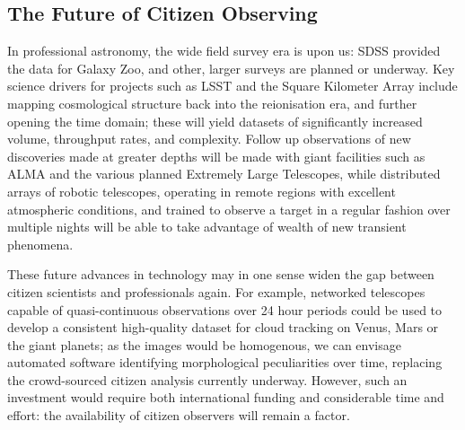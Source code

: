\documentclass{ar2e}
\begin{document}


\subsection{The Future of Citizen Observing}

In professional astronomy, the wide field survey era is upon us: SDSS provided
the data for Galaxy Zoo, and other, larger surveys are planned or underway. Key
science drivers for projects such as LSST and the Square Kilometer Array include
mapping cosmological structure back into the reionisation era, and  further
opening the time domain; these will yield datasets of significantly increased
volume, throughput rates, and complexity.  Follow up observations of new
discoveries made at greater depths will be made with giant facilities such as
ALMA and the various planned Extremely Large Telescopes, while distributed
arrays of robotic telescopes, operating in remote regions with excellent
atmospheric conditions, and trained to observe a target in a regular fashion
over multiple nights will be able to take advantage of wealth of new transient
phenomena. 

These future advances in technology may in one sense widen the gap between
citizen scientists and professionals again. For example, networked telescopes
capable of quasi-continuous observations over 24 hour periods could be used to
develop a consistent high-quality dataset for cloud tracking on Venus, Mars or
the giant planets; as the images would be homogenous, we can envisage automated
software identifying morphological peculiarities over time, replacing the
crowd-sourced citizen analysis currently underway.  However, such an investment
would require both international funding and considerable time and effort: the
availability of citizen observers will remain a factor.



\end{document}
